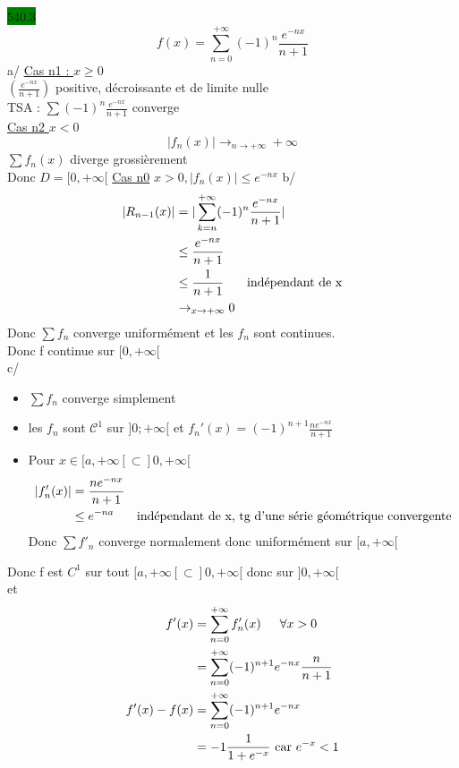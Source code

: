 \documentclass{article}
\begin{document}
\noindent \colorbox{green}{540.3}\\
\begin{equation*}
    f(x) = \sum_{n=0}^{+\infty} (-1)^n \frac{e^{-nx}}{n+1}
\end{equation*}
a/ \underline{Cas n1 : \(x \geq 0\)}\\
\((\frac{e^{-nx}}{n+1})\) positive, décroissante et de limite nulle\\
TSA : \(\sum (-1)^n \frac{e^{-nx}}{n+1}\) converge \\
\underline{Cas n2 \(x < 0\)} \begin{equation*}
    |f_n(x)| \rightarrow_{n \to +\infty} +\infty
\end{equation*}
\(\sum f_n(x)\) diverge grossièrement\\
Donc \(D = [0, +\infty[\)
\underline{Cas n0} \(x>0, |f_n(x)| \leq e^{-nx}\)
b/ \begin{align*}
    |R_{n-1}(x)| &= |\sum_{k=n}^{+\infty} (-1)^n \frac{e^{-nx}}{n+1}|\\
    &\leq \frac{e^{-nx}}{n+1}\\
    &\leq \frac{1}{n+1} \indent \text{ indépendant de x}\\
    &\rightarrow_{x \to +\infty} 0
\end{align*}
Donc \(\sum f_n\) converge uniformément et les \(f_n\) sont continues.\\
Donc f continue sur \([0, +\infty[\)\\
c/ \begin{itemize}
    \item \(\sum f_n\) converge simplement\\
    \item les \(f_n\) sont \(\mathcal{C}^1\) sur \(]0; +\infty[\) et \(f_n'(x) = (-1)^{n+1}\frac{ne^{-nx}}{n+1}\)\\
    \item Pour \(x \in [a, +\infty[\subset]0, +\infty[\)\begin{align*}
        |f_n'(x)| &= \frac{ne^{-nx}}{n+1}\\
        &\leq e^{-na} \indent \text{ indépendant de x, tg d'une série géométrique convergente}
    \end{align*}
    Donc \(\sum f'_n\) converge normalement donc uniformément sur \([a, +\infty[\)
\end{itemize}
Donc f est \(\mathcal{}C^1\) sur tout \([a, +\infty[\subset]0, +\infty[\)
donc sur \(]0, +\infty[\)\\
et \begin{align*}
    f'(x) &= \sum_{n=0}^{+\infty} f_n'(x) \indent \forall x > 0\\
    &= \sum_{n=0}^{+\infty} (-1)^{n+1} e^{-nx} \frac{n}{n+1}\\
    f'(x) - f(x) &= \sum_{n=0}^{+\infty}(-1)^{n+1}e^{-nx}\\
    &= -1 \frac{1}{1+e^{-x}} \text{ car } e^{-x} < 1
\end{align*}
\end{document}
